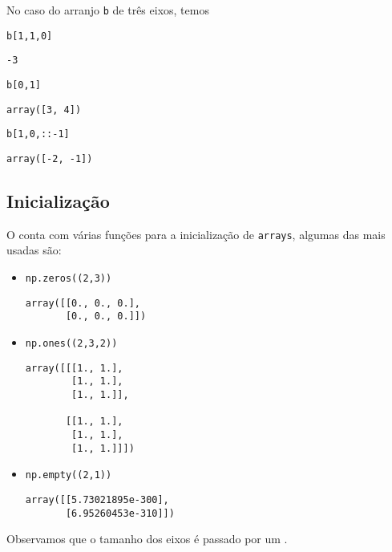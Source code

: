 No caso do arranjo \lstinline+b+ de três eixos, temos

\begin{lstlisting}
b[1,1,0]
\end{lstlisting}

\begin{verbatim}
-3
\end{verbatim}

\begin{lstlisting}
b[0,1]
\end{lstlisting}

\begin{verbatim}
array([3, 4])
\end{verbatim}

\begin{lstlisting}
b[1,0,::-1]
\end{lstlisting}

\begin{verbatim}
array([-2, -1])
\end{verbatim}


\subsection{Inicialização}

O {\numpy} conta com várias funções para a inicialização de \texttt{arrays}, algumas das mais usadas são:
\begin{itemize}
\item {\PYTHONnumpyDOTzeros} 

\begin{lstlisting}[xrightmargin=2.5em]
np.zeros((2,3))
\end{lstlisting}

\begin{verbatim}
array([[0., 0., 0.],
       [0., 0., 0.]])
\end{verbatim}

\item {\PYTHONnumpyDOTones} 

\begin{lstlisting}[xrightmargin=2.5em]
np.ones((2,3,2))
\end{lstlisting}

\begin{verbatim}
array([[[1., 1.],
        [1., 1.],
        [1., 1.]],

       [[1., 1.],
        [1., 1.],
        [1., 1.]]])
\end{verbatim}

\item {\PYTHONnumpyDOTempty} 

\begin{lstlisting}[xrightmargin=2.5em]
np.empty((2,1))
\end{lstlisting}

\begin{verbatim}
array([[5.73021895e-300],
       [6.95260453e-310]])
\end{verbatim}

\end{itemize}
Observamos que o tamanho dos eixos é passado por um {\PYTHONtuple}.

